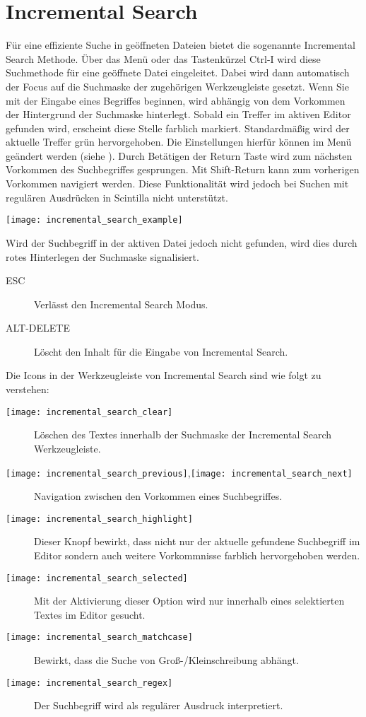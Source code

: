 \section{Incremental Search}

Für eine effiziente Suche in geöffneten Dateien bietet \codeblocks die sogenannte Incremental Search Methode. Über das Menü  oder das Tastenkürzel Ctrl-I wird diese Suchmethode für eine geöffnete Datei eingeleitet. Dabei wird dann automatisch der Focus auf die Suchmaske der zugehörigen Werkzeugleiste gesetzt. Wenn Sie mit der Eingabe eines Begriffes beginnen, wird abhängig von dem Vorkommen der Hintergrund der Suchmaske hinterlegt. Sobald ein Treffer im aktiven Editor gefunden wird, erscheint diese Stelle farblich markiert. Standardmäßig wird der aktuelle Treffer grün hervorgehoben. Die Einstellungen hierfür können im Menü  geändert werden (siehe ). Durch Betätigen der Return Taste wird zum nächsten Vorkommen des Suchbegriffes gesprungen. Mit Shift-Return kann zum vorherigen Vorkommen navigiert werden. Diese Funktionalität wird jedoch bei Suchen mit regulären Ausdrücken in Scintilla nicht unterstützt.

\texttt{[image: incremental\_search\_example]}

Wird der Suchbegriff in der aktiven Datei jedoch nicht gefunden, wird dies durch rotes Hinterlegen der Suchmaske signalisiert.

\begin{description}
\item[ESC] Verlässt den Incremental Search Modus.
\item[ALT-DELETE] Löscht den Inhalt für die Eingabe von Incremental Search.
\end{description}

Die Icons in der Werkzeugleiste von Incremental Search sind wie folgt zu verstehen:

\begin{description}
\item[\texttt{[image: incremental\_search\_clear]}] Löschen des Textes innerhalb der Suchmaske der Incremental Search Werkzeugleiste.
\item[\texttt{[image: incremental\_search\_previous]},\texttt{[image: incremental\_search\_next]}] Navigation zwischen den Vorkommen eines Suchbegriffes.
\item[\texttt{[image: incremental\_search\_highlight]}] Dieser Knopf bewirkt, dass nicht nur der aktuelle gefundene Suchbegriff im Editor sondern auch weitere Vorkommnisse farblich hervorgehoben werden.
\item[\texttt{[image: incremental\_search\_selected]}] Mit der Aktivierung dieser Option wird nur innerhalb eines selektierten Textes im Editor gesucht.
\item[\texttt{[image: incremental\_search\_matchcase]}] Bewirkt, dass die Suche von Groß-/Kleinschreibung abhängt.
\item[\texttt{[image: incremental\_search\_regex]}] Der Suchbegriff wird als regulärer Ausdruck interpretiert.
\end{description}


